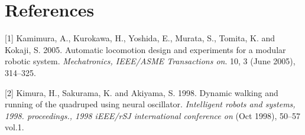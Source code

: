\documentclass{acm_proc_article-sp}
\begin{document}
\section{References}

{[}1{]} Kamimura, A., Kurokawa, H., Yoshida, E., Murata, S., Tomita, K.
and Kokaji, S. 2005. Automatic locomotion design and experiments for a
modular robotic system. \emph{Mechatronics, IEEE/ASME Transactions on}.
10, 3 (June 2005), 314--325.

{[}2{]} Kimura, H., Sakurama, K. and Akiyama, S. 1998. Dynamic walking
and running of the quadruped using neural oscillator. \emph{Intelligent
robots and systems, 1998. proceedings., 1998 iEEE/rSJ international
conference on} (Oct 1998), 50--57 vol.1.
\end{document}
